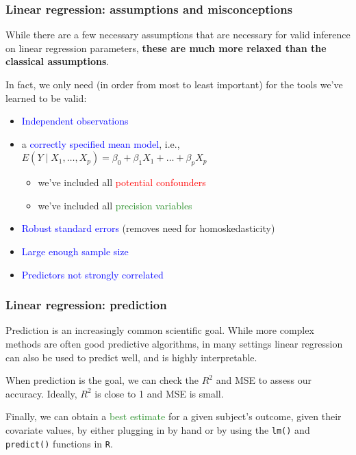 \documentclass[12pt, 
hyperref={colorlinks=true, linkcolor=blue, urlcolor=cyan},dvipsnames]{beamer}
\begin{document}
\begin{frame}
\frametitle{Linear regression: assumptions and misconceptions}
While there are a few necessary assumptions that are necessary for valid inference on linear regression parameters, \textbf{these are much more relaxed than the classical assumptions}. 

In fact, we only need (in order from most to least important) for the tools we've learned to be valid: \vspace{-0.3cm}
\begin{itemize}
\item \textcolor{blue}{Independent observations}
\item a \textcolor{blue}{correctly specified mean model}, i.e., $E(Y \mid X_1, \dots, X_p) = \beta_0 + \beta_1 X_1 + \dots + \beta_p X_p$
\begin{itemize}
\item we've included all \textcolor{red}{potential confounders}
\item we've included all \textcolor{ForestGreen}{precision variables}
\end{itemize}
\item \textcolor{blue}{Robust standard errors} (removes need for homoskedasticity)
\item \textcolor{blue}{Large enough sample size}
\item \textcolor{blue}{Predictors not strongly correlated}
\end{itemize} 
\end{frame}

\begin{frame}
\frametitle{Linear regression: prediction}
Prediction is an increasingly common scientific goal. While more complex methods are often good predictive algorithms, in many settings linear regression can also be used to predict well, and is highly interpretable.

When prediction is the goal, we can check the $R^2$ and MSE to assess our accuracy. Ideally, $R^2$ is close to 1 and MSE is small. 

Finally, we can obtain a \textcolor{ForestGreen}{best estimate} for a given subject's outcome, given their covariate values, by either plugging in by hand or by using the \texttt{lm()} and \texttt{predict()} functions in \texttt{R}.
\end{frame}
\end{document}
